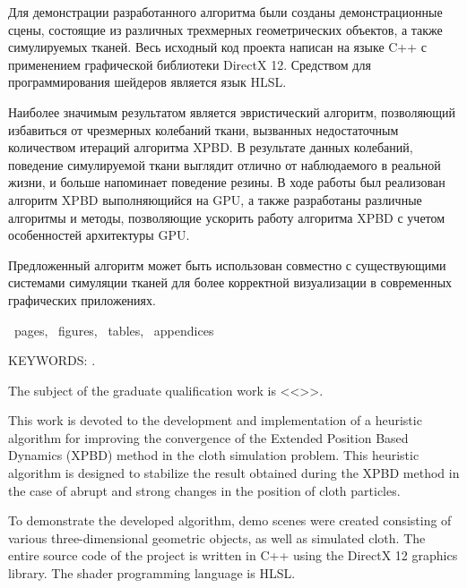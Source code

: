 Для демонстрации разработанного алгоритма были созданы демонстрационные сцены, состоящие из различных трехмерных геометрических объектов, а также симулируемых тканей. Весь исходный код проекта написан на языке C++ с применением графической библиотеки DirectX 12. Средством для программирования шейдеров является язык HLSL.

Наиболее значимым результатом является эвристический алгоритм, позволяющий избавиться от чрезмерных колебаний ткани, вызванных недостаточным количеством итераций алгоритма XPBD. В результате данных колебаний, поведение симулируемой ткани выглядит отлично от наблюдаемого в реальной жизни, и больше напоминает поведение резины. В ходе работы был реализован алгоритм XPBD выполняющийся на GPU, а также разработаны различные алгоритмы и методы, позволяющие ускорить работу алгоритма XPBD с учетом особенностей архитектуры GPU.

Предложенный алгоритм может быть использован совместно с существующими системами симуляции тканей для более корректной визуализации в современных графических приложениях.


\newpage

\printTheAbstract %

~pages, 
~figures, 
~tables,
~appendices%

{\MakeUppercase{Keywords: \keywordsEn}.} %
	
The subject of the graduate qualification work is <<\thesisTitleEn>>.
	
This work is devoted to the development and implementation of a heuristic algorithm for improving the convergence of the Extended Position Based Dynamics (XPBD) method in the cloth simulation problem. This heuristic algorithm is designed to stabilize the result obtained during the XPBD method in the case of abrupt and strong changes in the position of cloth particles.

To demonstrate the developed algorithm, demo scenes were created consisting of various three-dimensional geometric objects, as well as simulated cloth. The entire source code of the project is written in C++ using the DirectX 12 graphics library. The shader programming language is HLSL.

